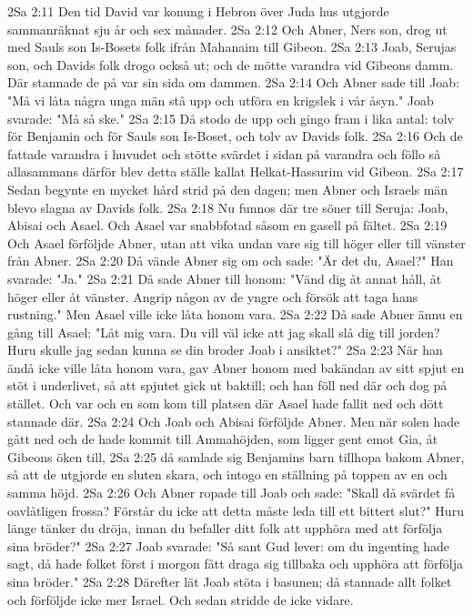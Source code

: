 2Sa 2:11  Den tid David var konung i Hebron över Juda hus utgjorde sammanräknat sju år och sex månader.
2Sa 2:12  Och Abner, Ners son, drog ut med Sauls son Is-Bosets folk ifrån Mahanaim till Gibeon.
2Sa 2:13  Joab, Serujas son, och Davids folk drogo också ut; och de mötte varandra vid Gibeons damm. Där stannade de på var sin sida om dammen.
2Sa 2:14  Och Abner sade till Joab: "Må vi låta några unga män stå upp och utföra en krigslek i vår åsyn." Joab svarade: "Må så ske."
2Sa 2:15  Då stodo de upp och gingo fram i lika antal: tolv för Benjamin och för Sauls son Is-Boset, och tolv av Davids folk.
2Sa 2:16  Och de fattade varandra i huvudet och stötte svärdet i sidan på varandra och föllo så allasammans därför blev detta ställe kallat Helkat-Hassurim vid Gibeon.
2Sa 2:17  Sedan begynte en mycket hård strid på den dagen; men Abner och Israels män blevo slagna av Davids folk.
2Sa 2:18  Nu funnos där tre söner till Seruja: Joab, Abisai och Asael. Och Asael var snabbfotad såsom en gasell på fältet.
2Sa 2:19  Och Asael förföljde Abner, utan att vika undan vare sig till höger eller till vänster från Abner.
2Sa 2:20  Då vände Abner sig om och sade: "Är det du, Asael?" Han svarade: "Ja."
2Sa 2:21  Då sade Abner till honom: "Vänd dig åt annat håll, åt höger eller åt vänster. Angrip någon av de yngre och försök att taga hans rustning." Men Asael ville icke låta honom vara.
2Sa 2:22  Då sade Abner ännu en gång till Asael: "Låt mig vara. Du vill väl icke att jag skall slå dig till jorden? Huru skulle jag sedan kunna se din broder Joab i ansiktet?"
2Sa 2:23  När han ändå icke ville låta honom vara, gav Abner honom med bakändan av sitt spjut en stöt i underlivet, så att spjutet gick ut baktill; och han föll ned där och dog på stället. Och var och en som kom till platsen där Asael hade fallit ned och dött stannade där.
2Sa 2:24  Och Joab och Abisai förföljde Abner. Men när solen hade gått ned och de hade kommit till Ammahöjden, som ligger gent emot Gia, åt Gibeons öken till,
2Sa 2:25  då samlade sig Benjamins barn tillhopa bakom Abner, så att de utgjorde en sluten skara, och intogo en ställning på toppen av en och samma höjd.
2Sa 2:26  Och Abner ropade till Joab och sade: "Skall då svärdet få oavlåtligen frossa? Förstår du icke att detta måste leda till ett bittert slut?" Huru länge tänker du dröja, innan du befaller ditt folk att upphöra med att förfölja sina bröder?"
2Sa 2:27  Joab svarade: "Så sant Gud lever: om du ingenting hade sagt, då hade folket först i morgon fått draga sig tillbaka och upphöra att förfölja sina bröder."
2Sa 2:28  Därefter lät Joab stöta i basunen; då stannade allt folket och förföljde icke mer Israel. Och sedan stridde de icke vidare.
